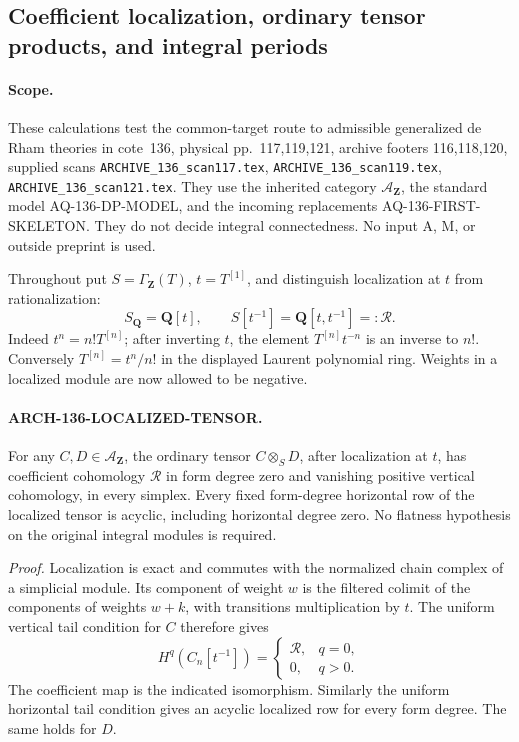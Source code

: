 \subsection{Coefficient localization, ordinary tensor products, and integral periods}
\label{arch136:localized-tensor}

\paragraph{Scope.}
These calculations test the common-target route to admissible generalized
de Rham theories in cote~136, physical pp.~117,119,121, archive footers
116,118,120, supplied scans
\texttt{ARCHIVE\_136\_scan117.tex},
\texttt{ARCHIVE\_136\_scan119.tex},
\texttt{ARCHIVE\_136\_scan121.tex}.
They use the inherited category \(\mathcal A_{\mathbf Z}\), the standard
model AQ-136-DP-MODEL, and the incoming replacements
AQ-136-FIRST-SKELETON. They do not decide integral connectedness.
No input A, M, or outside preprint is used.

Throughout put \(S=\Gamma_{\mathbf Z}(T)\), \(t=T^{[1]}\), and
distinguish localization at \(t\) from rationalization:
\[
 S_{\mathbf Q}=\mathbf Q[t],
 \qquad S[t^{-1}]=\mathbf Q[t,t^{-1}]=:\mathcal R.
 \tag{136.LT1}
\]
Indeed \(t^n=n!T^{[n]}\); after inverting \(t\), the element
\(T^{[n]}t^{-n}\) is an inverse to \(n!\). Conversely
\(T^{[n]}=t^n/n!\) in the displayed Laurent polynomial ring.
Weights in a localized module are now allowed to be negative.

\paragraph{ARCH-136-LOCALIZED-TENSOR.}
For any \(C,D\in\mathcal A_{\mathbf Z}\), the ordinary tensor
\(C\otimes_S D\), after localization at \(t\), has coefficient
cohomology \(\mathcal R\) in form degree zero and vanishing positive
vertical cohomology, in every simplex. Every fixed form-degree
horizontal row of the localized tensor is acyclic, including
horizontal degree zero. No flatness hypothesis on the original
integral modules is required.

\emph{Proof.}
Localization is exact and commutes with the normalized chain complex
of a simplicial module. Its component of weight \(w\) is the filtered
colimit of the components of weights \(w+k\), with transitions
multiplication by \(t\). The uniform vertical tail condition for
\(C\) therefore gives
\[
 H^q(C_n[t^{-1}])=
 \begin{cases}
 \mathcal R,&q=0,\\
 0,&q>0.
 \end{cases}
 \tag{136.LT2}
\]
The coefficient map is the indicated isomorphism. Similarly the
uniform horizontal tail condition gives an acyclic localized row
for every form degree. The same holds for \(D\).

